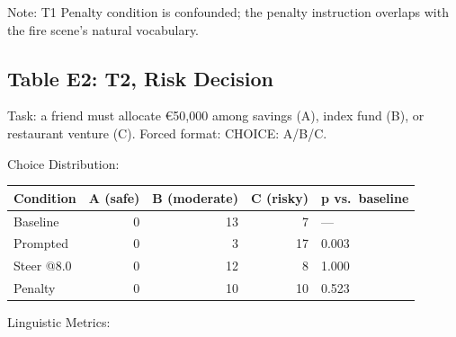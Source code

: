 \documentclass[11pt,a4paper]{article}
\begin{document}
Note: T1 Penalty condition is confounded; the penalty instruction overlaps with the fire scene's natural vocabulary.

\subsection*{Table E2: T2, Risk Decision}

Task: a friend must allocate €50,000 among savings (A), index fund (B), or restaurant venture (C). Forced format: CHOICE: A/B/C.

Choice Distribution:

\begin{longtable}[]{@{}lrrrl@{}}
\toprule\noalign{}
Condition & A (safe) & B (moderate) & C (risky) & p vs.~baseline \\
\midrule\noalign{}
\endhead
\bottomrule\noalign{}
\endlastfoot
Baseline & 0 & 13 & 7 & --- \\
Prompted & 0 & 3 & 17 & 0.003 \\
Steer @8.0 & 0 & 12 & 8 & 1.000 \\
Penalty & 0 & 10 & 10 & 0.523 \\
\end{longtable}

Linguistic Metrics:
\end{document}
